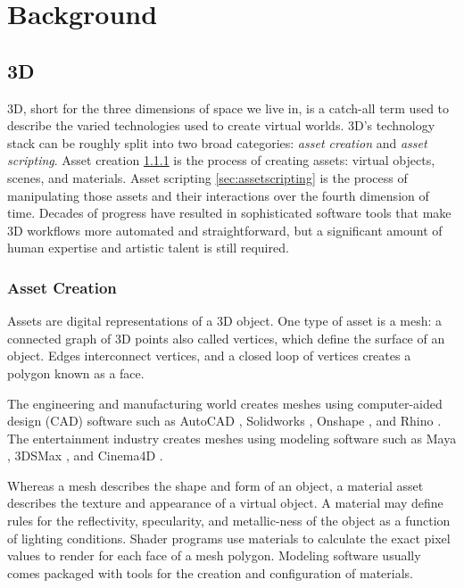 \documentclass{article}
\begin{document}
\section{Background}
\label{sec:background}

\subsection{3D}
\label{sec:3d}

3D, short for the three dimensions of space we live in, is a catch-all term used to describe the varied technologies used to create virtual worlds. 3D’s technology stack can be roughly split into two broad categories: \emph{asset creation} and \emph{asset scripting}. Asset creation \ref{sec:assetcreation} is the process of creating assets: virtual objects, scenes, and materials. Asset scripting \ref{sec:assetscripting} is the process of manipulating those assets and their interactions over the fourth dimension of time. Decades of progress have resulted in sophisticated software tools that make 3D workflows more automated and straightforward, but a significant amount of human expertise and artistic talent is still required.

\subsubsection{Asset Creation}
\label{sec:assetcreation}

Assets are digital representations of a 3D object. One type of asset is a mesh: a connected graph of 3D points also called vertices, which define the surface of an object. Edges interconnect vertices, and a closed loop of vertices creates a polygon known as a face.

The engineering and manufacturing world creates meshes using computer-aided design (CAD) software such as AutoCAD \cite{autocad}, Solidworks \cite{solidworks}, Onshape \cite{onshape}, and Rhino \cite{rhino}. The entertainment industry creates meshes using modeling software such as Maya \cite{maya}, 3DSMax \cite{3dsmax}, and Cinema4D \cite{cinema4d}.

Whereas a mesh describes the shape and form of an object, a material asset describes the texture and appearance of a virtual object. A material may define rules for the reflectivity, specularity, and metallic-ness of the object as a function of lighting conditions. Shader programs use materials to calculate the exact pixel values to render for each face of a mesh polygon. Modeling software usually comes packaged with tools for the creation and configuration of materials.
\end{document}
